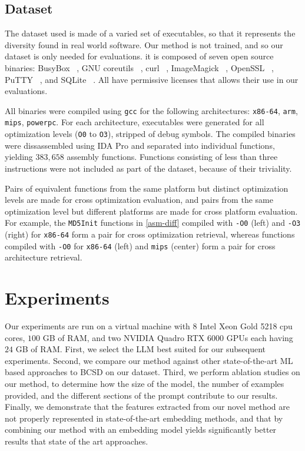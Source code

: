\subsection{Dataset}

The dataset used is made of a varied set of executables, so that it represents the diversity found in real world software.
Our method is not trained, and so our dataset is only needed for evaluations. it is composed of seven open source binaries:
BusyBox ~\cite{busybox}, GNU coreutils ~\cite{coreutils}, curl ~\cite{curl}, ImageMagick ~\cite{image-magick}, OpenSSL ~\cite{openssl},
PuTTY ~\cite{putty}, and SQLite ~\cite{sqlite}. All have permissive licenses that allows their use in our evaluations. 

All binaries were compiled using \texttt{gcc} for the following architectures: \texttt{x86-64}, \texttt{arm}, \texttt{mips}, \texttt{powerpc}.
For each architecture, executables were generated for all optimization levels (\texttt{O0} to \texttt{O3}), stripped of debug symbols.
The compiled binaries were dissassembled using IDA Pro and separated into individual functions, yielding \(383,658\) assembly functions.
Functions consisting of less than three instructions were not included as part of the dataset, because of their triviality.

Pairs of equivalent functions from the same platform but distinct optimization levels are made for cross optimization
evaluation, and pairs from the same optimization level but different platforms are made for cross
platform evaluation. For example, the \texttt{MD5Init} functions in \ref{asm-diff} compiled with \texttt{-O0} (left) and
\texttt{-O3} (right) for \texttt{x86-64} form a pair for cross optimization retrieval, whereas functions compiled with \texttt{-O0}
for \texttt{x86-64} (left) and \texttt{mips} (center) form a pair for cross architecture retrieval.

\section{Experiments}

Our experiments are run on a virtual machine with 8 Intel Xeon Gold 5218 cpu cores, \(100\) GB of RAM, and two NVIDIA Quadro RTX
6000 GPUs each having  \(24\) GB of RAM. First, we select the LLM best suited for our subsequent experiments. Second, we compare our
method against other state-of-the-art ML based approaches to BCSD on our dataset. Third, we perform ablation studies on our method,
to determine how the size of the model, the number of examples provided, and the different sections of the prompt contribute to our results.
Finally, we demonstrate that the features extracted from our novel method are not properly represented in state-of-the-art embedding methods,
and that by combining our method with an embedding model yields significantly better results that state of the art approaches.


